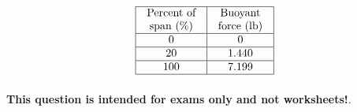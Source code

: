 $$\vbox{\offinterlineskip
\halign{\strut
\vrule \quad\hfil # \ \hfil & 
\vrule \quad\hfil # \ \hfil \vrule \cr
\noalign{\hrule}
%
Percent of & Buoyant  \cr
%
span (\%) & force (lb) \cr
%
\noalign{\hrule}
%
0 & 0 \cr
%
\noalign{\hrule}
%
20 & 1.440 \cr
%
\noalign{\hrule}
%
100 & 7.199 \cr
%
\noalign{\hrule}
} %
}$$ %








{\bf This question is intended for exams only and not worksheets!}.



